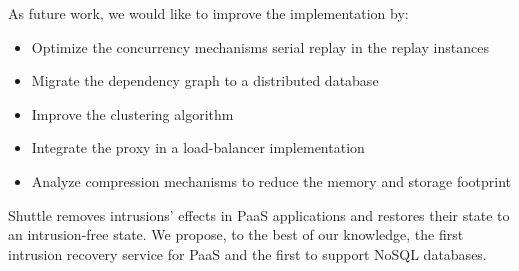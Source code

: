As future work, we would like to improve the implementation by:
\begin{itemize}
\item Optimize the concurrency mechanisms serial replay in the replay instances
\item Migrate the dependency graph to a distributed database
\item Improve the clustering algorithm
\item Integrate the proxy in a load-balancer implementation
\item Analyze compression mechanisms to reduce the memory and storage footprint
\end{itemize}


Shuttle removes intrusions' effects in \ac{PaaS} applications and restores their state to an intrusion-free state. We propose, to the best of our knowledge, the first intrusion recovery service for \ac{PaaS} and the first to support \acs{NoSQL} databases.
